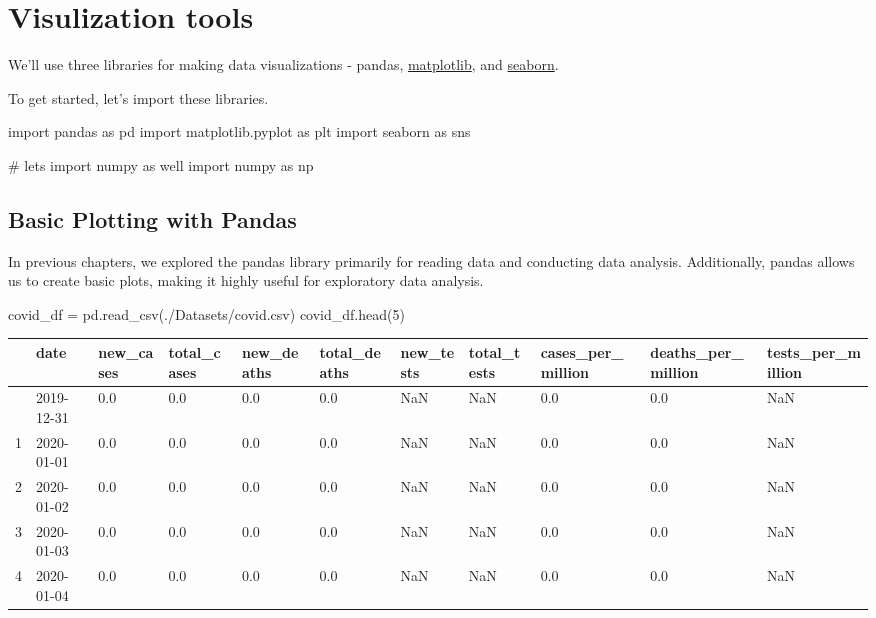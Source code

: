 \documentclass[
  letterpaper,
  DIV=11,
  numbers=noendperiod]{scrreprt}
\newenvironment{Shaded}{\begin{snugshade}}{\end{snugshade}}
\newcommand{\CommentTok}[1]{\textcolor[rgb]{0.37,0.37,0.37}{#1}}
\newcommand{\DecValTok}[1]{\textcolor[rgb]{0.68,0.00,0.00}{#1}}
\newcommand{\ImportTok}[1]{\textcolor[rgb]{0.00,0.46,0.62}{#1}}
\newcommand{\NormalTok}[1]{\textcolor[rgb]{0.00,0.23,0.31}{#1}}
\newcommand{\OperatorTok}[1]{\textcolor[rgb]{0.37,0.37,0.37}{#1}}
\newcommand{\StringTok}[1]{\textcolor[rgb]{0.13,0.47,0.30}{#1}}
\begin{document}
\hypertarget{visulization-tools}{%
\section{Visulization tools}\label{visulization-tools}}

We'll use three libraries for making data visualizations - pandas,
\href{https://matplotlib.org/}{matplotlib}, and
\href{https://seaborn.pydata.org/}{seaborn}.

To get started, let's import these libraries.

\begin{Shaded}
\begin{Highlighting}[]
\ImportTok{import}\NormalTok{ pandas }\ImportTok{as}\NormalTok{ pd}
\ImportTok{import}\NormalTok{ matplotlib.pyplot }\ImportTok{as}\NormalTok{ plt}
\ImportTok{import}\NormalTok{ seaborn }\ImportTok{as}\NormalTok{ sns}

\CommentTok{\# let\textquotesingle{}s import numpy as well}
\ImportTok{import}\NormalTok{ numpy }\ImportTok{as}\NormalTok{ np}
\end{Highlighting}
\end{Shaded}

\hypertarget{basic-plotting-with-pandas}{%
\subsection{Basic Plotting with
Pandas}\label{basic-plotting-with-pandas}}

In previous chapters, we explored the pandas library primarily for
reading data and conducting data analysis. Additionally, pandas allows
us to create basic plots, making it highly useful for exploratory data
analysis.

\begin{Shaded}
\begin{Highlighting}[]
\NormalTok{covid\_df }\OperatorTok{=}\NormalTok{ pd.read\_csv(}\StringTok{\textquotesingle{}./Datasets/covid.csv\textquotesingle{}}\NormalTok{)}
\NormalTok{covid\_df.head(}\DecValTok{5}\NormalTok{)}
\end{Highlighting}
\end{Shaded}

\begin{longtable}[]{@{}lllllllllll@{}}
\toprule\noalign{}
& date & new\_cases & total\_cases & new\_deaths & total\_deaths &
new\_tests & total\_tests & cases\_per\_million & deaths\_per\_million &
tests\_per\_million \\
\midrule\noalign{}
\endhead
\bottomrule\noalign{}
\endlastfoot
0 & 2019-12-31 & 0.0 & 0.0 & 0.0 & 0.0 & NaN & NaN & 0.0 & 0.0 & NaN \\
1 & 2020-01-01 & 0.0 & 0.0 & 0.0 & 0.0 & NaN & NaN & 0.0 & 0.0 & NaN \\
2 & 2020-01-02 & 0.0 & 0.0 & 0.0 & 0.0 & NaN & NaN & 0.0 & 0.0 & NaN \\
3 & 2020-01-03 & 0.0 & 0.0 & 0.0 & 0.0 & NaN & NaN & 0.0 & 0.0 & NaN \\
4 & 2020-01-04 & 0.0 & 0.0 & 0.0 & 0.0 & NaN & NaN & 0.0 & 0.0 & NaN \\
\end{longtable}
\end{document}
